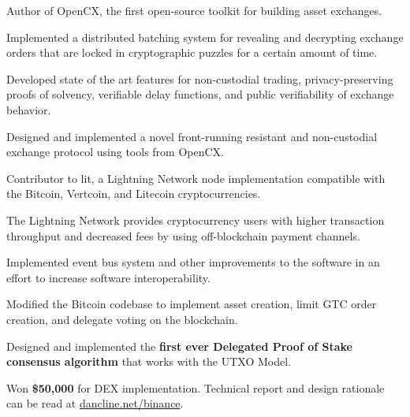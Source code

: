 
\begin{tightemize}
  \item Author of OpenCX, the first open-source toolkit for building asset exchanges.
  \item Implemented a distributed batching system for revealing and decrypting exchange orders that are locked in cryptographic puzzles for a certain amount of time.
  \item Developed state of the art features for non-custodial trading, privacy-preserving proofs of solvency, verifiable delay functions, and public verifiability of exchange behavior.
  \item Designed and implemented a novel front-running resistant and non-custodial exchange protocol using tools from OpenCX.
\end{tightemize}
\subsectionsep

\begin{tightemize}
  \item Contributor to lit, a Lightning Network node implementation compatible with the Bitcoin, Vertcoin, and Litecoin cryptocurrencies.
  \item The Lightning Network provides cryptocurrency users with higher transaction throughput and decreased fees by using off-blockchain payment channels.
  \item Implemented event bus system and other improvements to the software in an effort to increase software interoperability.
\end{tightemize}
\subsectionsep

\begin{tightemize}
  \item Modified the Bitcoin codebase to implement asset creation, limit GTC
    order creation, and delegate voting on the blockchain.
  \item Designed and implemented the \textbf{first ever Delegated Proof of
      Stake consensus algorithm} that works with the UTXO Model.
  \item Won \textbf{\$50,000} for DEX implementation. Technical report and
    design rationale can be read at
    \href{https://dancline.net/binance/}{dancline.net/binance}.
\end{tightemize}
